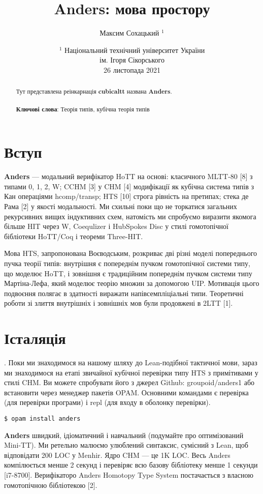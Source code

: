 \documentclass{article}
\theoremstyle{definition}
\begin{document}
\title{Anders: мова простору}
\author{Максим Сохацький $^1$}
\date{ \small $^1$ Національний технічний університет України \\
       ім. Ігоря Сікорського \\
       26 листопада 2021 }
\maketitle

\begin{abstract}
Тут представлена реінкарнація \textbf{cubicaltt} названа \textbf{Anders}.
\\
\\
{\bf Ключові слова}: Теорія типів, кубічна теорія типів
\end{abstract}

\section*{Вступ}

\textbf{Anders} — модальний верифікатор HoTT на основі: класичного MLTT-80 [8]
з типами 0, 1, 2, W; CCHM [3] у CHM [4] модифікації як кубічна
система типів з Кан операціями hcomp/transp; HTS [10] строга рівність
на претипах; стека де Рама [2] у якості модальності. Ми схильні поки
що не торкатися загальних рекурсивних вищих індуктивних схем,
натомість ми спробуємо виразити якомога більше HIT через W, Coequlizer
і HubSpokes Disc у стилі гомотопічної бібліотеки HoTT/Coq і теореми Three-HIT.

Мова HTS, запропонована Воєводським, розкриває дві різні моделі
попереднього пучка теорії типів: внутрішня є попереднім пучком
гомотопічної системи типу, що моделює HoTT, і зовнішня є традиційним
попереднім пучком системи типу Мартіна-Лефа, який моделює теорію множин
за допомогою UIP. Мотивація цього подвоєння полягає в здатності виражати
напівсемпліціальні типи. Теоретичні роботи зі злиття внутрішніх і
зовнішніх мов були продовжені в 2LTT [1].

\newpage
\section{Істаляція}. Поки ми знаходимося на нашому шляху до Lean-подібної
тактичної мови, зараз ми знаходимося на етапі звичайної кубічної перевірки
типу HTS з примітивами у стилі CHM. Ви можете спробувати його з джерел
Github: groupoid/anders1 або встановити через менеджер пакетів OPAM.
Основними командами є перевірка (для перевірки програми) і repl (для входу в оболонку перевірки).
\begin{lstlisting}
$ opam install anders
\end{lstlisting}

\textbf{Anders} швидкий, ідіоматичний і навчальний (подумайте про оптимізований Mini-TT).
Ми ретельно малюємо улюблений синтаксис, сумісний з Lean, щоб відповідати 200
LOC у Menhir. Ядро CHM — це 1K LOC. Весь Anders компілюється менше 2 секунд і
перевіряє всю базову бібліотеку менше 1 секунди [i7-8700]. Верифікаторо Anders
Homotopy Type System постачається з власною гомотопічною бібліотекою [2].
\end{document}

